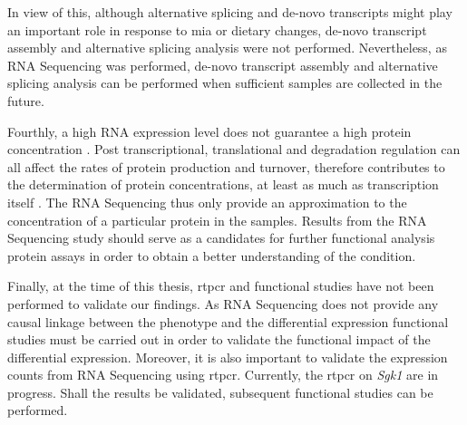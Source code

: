 \documentclass[12pt]{scrbook}
\begin{document}
In view of this, although alternative splicing and de-novo transcripts might play an important role in response to \gls{mia} or dietary changes, de-novo transcript assembly and alternative splicing analysis were not performed. 
Nevertheless, as RNA Sequencing was performed, de-novo transcript assembly and alternative splicing analysis can be performed when sufficient samples are collected in the future. 

Fourthly, a high RNA expression level does not guarantee a high protein concentration \citep{Vogel2012}.
Post transcriptional, translational and degradation regulation can all affect the rates of protein production and turnover, therefore contributes to the determination of protein concentrations, at least as much as transcription itself \citep{Vogel2012}.
The RNA Sequencing thus only provide an approximation to the concentration of a particular protein in the samples.
Results from the RNA Sequencing study should serve as a candidates for further functional analysis protein assays in order to obtain a better understanding of the condition.

Finally, at the time of this thesis, \gls{rtpcr} and functional studies have not been performed to  validate our findings.
As RNA Sequencing does not provide any causal linkage between the phenotype and the differential expression functional studies must be carried out in order to validate the functional impact of the differential expression. 
Moreover, it is also important to validate the expression counts from RNA Sequencing using \gls{rtpcr}.
Currently, the \gls{rtpcr} on \textit{Sgk1} are in progress. 
Shall the results be validated, subsequent functional studies can be performed. 

\newpage
\end{document}

